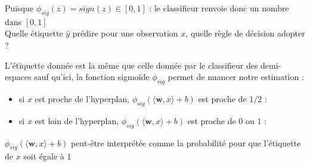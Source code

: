\documentclass[10pt]{beamer}
\newcommand{\hsp}{\hspace*{1em}}
\begin{document}

\begin{frame}{}
	Puisque $\phi_{sig} (z) =  sign(z) \in [0,1]$ : le classifieur renvoie donc un nombre dans $[0,1]$\\[0.5em]
	 Quelle étiquette $\hat{y}$ prédire pour une observation $x$, \ie quelle règle de décision adopter ?
	
	
	
	\vspace{5em}
	
L'étiquette donnée est la même que celle donnée par le classifieur des demi-espaces sauf qu'ici, la fonction sigmoïde $\phi_{sig}$ permet de nuancer notre estimation : \\[1em]
\begin{itemize}
	\item si $x$ est proche de l'hyperplan, $\phi_{sig} (\langle\mathbf{w},x\rangle + b)$  est proche de $1/2$ : \\[4em]
	
	\item si $x$ est loin de l'hyperplan, $\phi_{sig} (\langle\mathbf{w},x\rangle + b)$  est proche de $0$ ou $1$ : \\[4em]
\end{itemize}
	 \hsp $\phi_{sig} (\langle\mathbf{w},x\rangle + b)$ peut-être interprétée comme la probabilité pour que l'étiquette de $x$ soit égale à $1$
\end{frame}

\end{document}
